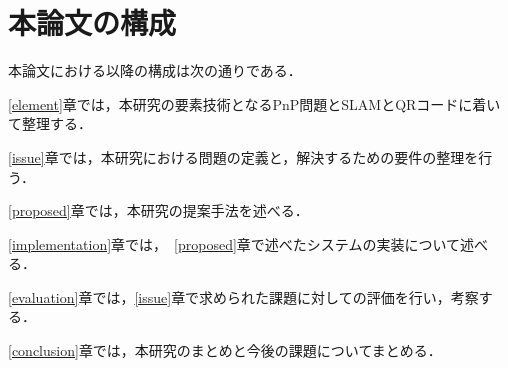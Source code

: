 \section{本論文の構成}

本論文における以降の構成は次の通りである．


\ref{element}章では，本研究の要素技術となるPnP問題とSLAMとQRコードに着いて整理する．

\ref{issue}章では，本研究における問題の定義と，解決するための要件の整理を行う．

\ref{proposed}章では，本研究の提案手法を述べる．

\ref{implementation}章では，~\ref{proposed}章で述べたシステムの実装について述べる．

\ref{evaluation}章では，\ref{issue}章で求められた課題に対しての評価を行い，考察する．

\ref{conclusion}章では，本研究のまとめと今後の課題についてまとめる．
